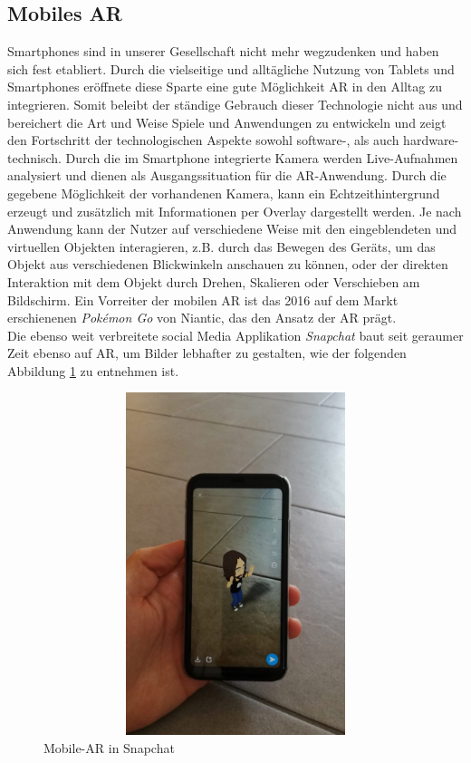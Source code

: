 \subsection*{Mobiles AR}
Smartphones sind in unserer Gesellschaft nicht mehr wegzudenken und haben sich fest etabliert. Durch die vielseitige und alltägliche Nutzung 
von Tablets und Smartphones eröffnete diese Sparte eine gute Möglichkeit \acl{AR} in den Alltag zu integrieren. Somit beleibt der ständige 
Gebrauch dieser Technologie nicht aus und bereichert die Art und Weise Spiele und Anwendungen zu entwickeln und zeigt den Fortschritt der technologischen 
Aspekte sowohl software-, als auch hardware-technisch.
Durch die im Smartphone integrierte Kamera werden Live-Aufnahmen analysiert und dienen als Ausgangssituation für die \acs{AR}-Anwendung. Durch 
die gegebene Möglichkeit der vorhandenen Kamera, kann ein Echtzeithintergrund erzeugt und zusätzlich mit Informationen per Overlay dargestellt 
werden. Je nach Anwendung kann der Nutzer auf verschiedene Weise mit den eingeblendeten und virtuellen Objekten interagieren, z.B. durch das 
Bewegen des Geräts, um das Objekt aus verschiedenen Blickwinkeln anschauen zu können, oder der direkten Interaktion mit dem Objekt durch 
Drehen, Skalieren oder Verschieben am Bildschirm. Ein Vorreiter der mobilen AR ist das 2016 auf dem Markt erschienenen \textit{Pokémon Go} 
von Niantic, das den Ansatz der \acs{AR} prägt. \cite{pokemongo.2016a}
\\ 
Die ebenso weit verbreitete social Media Applikation \textit{Snapchat} baut seit geraumer Zeit ebenso auf \acl{AR}, um Bilder lebhafter zu 
gestalten, wie der folgenden Abbildung \ref{pic:snapchatAR} zu entnehmen ist. 
\\ 
\linebreak 
\begin{figure}[hbt!]
    \centering
    \includegraphics[width=15cm,height=10cm,keepaspectratio]{2Grundlagen/Bilder/snapchatAR.jpeg}
    \caption{Mobile-AR in Snapchat}
    \label{pic:snapchatAR}
\end{figure}
\pagebreak
